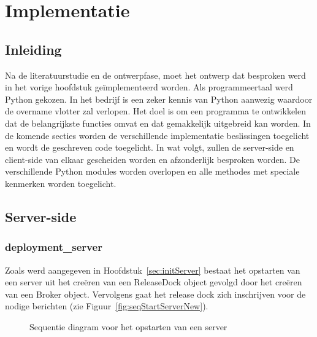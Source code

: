 \chapter{Implementatie}
\section{Inleiding}
Na de literatuurstudie en de ontwerpfase, moet het ontwerp dat besproken werd in het vorige hoofdstuk geïmplementeerd worden.
Als programmeertaal werd Python gekozen.
In het bedrijf is een zeker kennis van Python aanwezig waardoor de overname vlotter zal verlopen.
Het doel is om een programma te ontwikkelen dat de belangrijkste functies omvat en dat gemakkelijk uitgebreid kan worden.
In de komende secties worden de verschillende implementatie beslissingen toegelicht en wordt de geschreven code toegelicht.
In wat volgt, zullen de server-side en client-side van elkaar gescheiden worden en afzonderlijk besproken worden.
De verschillende Python modules worden overlopen en alle methodes met speciale kenmerken worden toegelicht.

\section{Server-side}
\subsection{deployment\_server}
Zoals werd aangegeven in Hoofdstuk~\ref{sec:initServer} bestaat het opstarten van een server uit het creëren van een ReleaseDock object gevolgd door het creëren van een Broker object.
Vervolgens gaat het release dock zich inschrijven voor de nodige berichten (zie Figuur~\vref{fig:seqStartServerNew}).

\begin{figure}[!ht]
\centering
{}
\caption{Sequentie diagram voor het opstarten van een server}
\label{fig:seqStartServerNew}
\end{figure}

